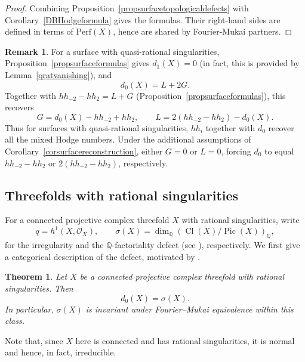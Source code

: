 \documentclass{amsart}
\theoremstyle{plain}
\newtheorem{theorem}[prop]{Theorem}
\theoremstyle{definition}
\newtheorem{remark}[prop]{Remark}
\newcommand{\bbQ}{\mathbb{Q}}
\newcommand{\Perf}{\mathrm{Perf}}
\DeclareMathOperator{\Cl}{Cl}
\DeclareMathOperator{\Pic}{Pic}
\begin{document}
\begin{proof}
Combining Proposition~\ref{propsurfacetopologicaldefects} with Corollary~\ref{DBHodgeformula} gives the formulas. Their right-hand sides are defined in terms of $\Perf(X)$, hence are shared by Fourier-Mukai partners.
\end{proof}

\begin{remark}
For a surface with quasi-rational singularities, Proposition~\ref{propsurfaceformulas} gives $d_1(X)=0$ (in fact, this is provided by Lemma~\ref{qratvanishing}), and
\[
d_0(X)=L+2G.
\]
Together with $hh_{-2}-hh_2=L+G$ (Proposition~\ref{propsurfaceformulas}), this recovers
\[
G=d_0(X)-hh_{-2}+hh_2,\qquad
L=2(hh_{-2}-hh_2)-d_0(X).
\]
Thus for surfaces with quasi-rational singularities, $hh_i$ together with $d_0$ recover all the mixed Hodge numbers. Under the additional assumptions of Corollary~\ref{corsurfacereconstruction}, either $G=0$ or $L=0$, forcing $d_0$ to equal $hh_{-2}-hh_2$ or $2(hh_{-2}-hh_2)$, respectively.
\end{remark}

\medskip

\subsection{Threefolds with rational singularities}

For a connected projective complex threefold $X$ with rational singularities, write
\[
q=h^1(X,\mathcal O_X),\qquad
\sigma(X)=\dim_{\bbQ}(\Cl(X)/\Pic(X))_{\bbQ},
\]
for the irregularity and the $\bbQ$-factoriality defect (see \cite{Kaw88,PP25b}), respectively.
We first give a categorical description of the defect, motivated by \cite{KPS21}.


\begin{theorem}\label{proptopdefect}
Let $X$ be a connected projective complex threefold with rational singularities. Then
\[
d_0(X)=\sigma(X).
\]
In particular, $\sigma(X)$ is invariant under Fourier--Mukai equivalence within this class.
\end{theorem}


Note that, since $X$ here is connected and has rational singularities, it is normal and hence, in fact, irreducible.
\end{document}
